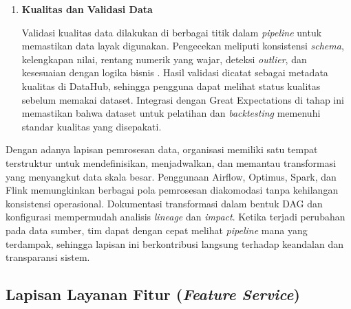 \begin{enumerate}
    Spark menangani transformasi \textit{batch} yang memerlukan komputasi terdistribusi, seperti agregasi berskala besar, \textit{join} kompleks, dan \textit{windowing} historis \autocite{apachespark2024}. \textit{Catalyst optimizer} pada Spark meningkatkan efisiensi rencana eksekusi dan memanfaatkan struktur data kolumnar jika tersedia \autocite{zaharia2016spark}. Spark dapat membaca dan menulis ke ClickHouse maupun MinIO sehingga integrasi dengan \textit{offline store} dan \textit{object storage} berjalan mulus. Hasil pemrosesan ini kemudian dimaterialisasikan sebagai fitur historis melalui Feast.

    \vspace{0.5em}

    \item \textbf{Kualitas dan Validasi Data}  

    Validasi kualitas data dilakukan di berbagai titik dalam \textit{pipeline} untuk memastikan data layak digunakan. Pengecekan meliputi konsistensi \textit{schema}, kelengkapan nilai, rentang numerik yang wajar, deteksi \textit{outlier}, dan kesesuaian dengan logika bisnis \autocite{chien2022improve}. Hasil validasi dicatat sebagai metadata kualitas di DataHub, sehingga pengguna dapat melihat status kualitas sebelum memakai dataset. Integrasi dengan Great Expectations di tahap ini memastikan bahwa dataset untuk pelatihan dan \textit{backtesting} memenuhi standar kualitas yang disepakati.

    \vspace{0.5em}
\end{enumerate}

Dengan adanya lapisan pemrosesan data, organisasi memiliki satu tempat terstruktur untuk mendefinisikan, menjadwalkan, dan memantau transformasi yang menyangkut data skala besar. Penggunaan Airflow, Optimus, Spark, dan Flink memungkinkan berbagai pola pemrosesan diakomodasi tanpa kehilangan konsistensi operasional. Dokumentasi transformasi dalam bentuk DAG dan konfigurasi mempermudah analisis \textit{lineage} dan \textit{impact}. Ketika terjadi perubahan pada data sumber, tim dapat dengan cepat melihat \textit{pipeline} mana yang terdampak, sehingga lapisan ini berkontribusi langsung terhadap keandalan dan transparansi sistem.

\subsection{Lapisan Layanan Fitur (\textit{Feature Service})}

